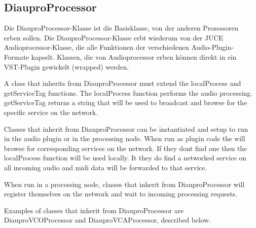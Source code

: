 \subsection{DiauproProcessor}

Die DiauproProcessor-Klasse ist die Basisklasse, von der anderen Prozessoren erben sollen. Die DiauproProcessor-Klasse erbt wiederum von der JUCE Audioprocessor-Klasse, die alle Funktionen der verschiedenen Audio-Plugin-Formate kapselt. Klassen, die von Audioprocessor erben können direkt in ein VST-Plugin gewickelt (wrapped) werden.

A class that inherits from DiauproProcessor must extend the localProcess and getServiceTag functions. The localProcess function performs the audio processing. getServiceTag returns a string that will be used to broadcast and browse for the specific service on the network.

Classes that inherit from DiauproProcessor can be instantiated and setup to run in the audio plugin  or in the processing node. When run as plugin code the will browse for corresponding services on the network. If they dont find one then the localProcess function will be used locally. It they do find a networked service on all incoming audio and midi data will be forwarded to that service.

When run in a processing node, classes that inherit from DiauproProcessor will register themselves on the network and wait to incoming processing requests.

Examples of classes that inherit from DiauproProcessor are DiauproVCOProcessor and DiauproVCAProcessor, described below.